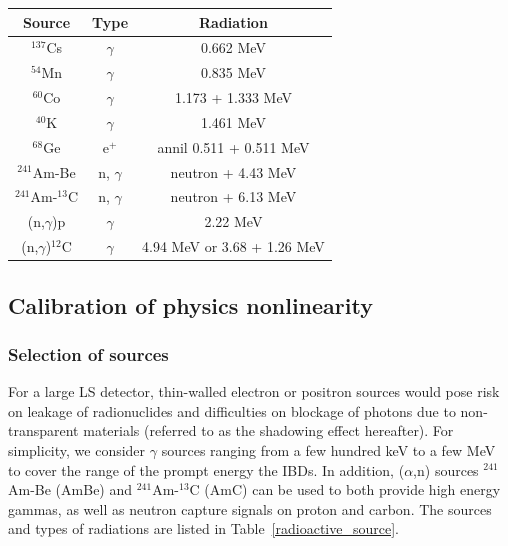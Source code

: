 \documentclass[a4paper,10pt,twoside]{cpc-hepnp}
\begin{document}
\begin{CJK*}{GB}{gbsn}
\begin{multicols}{2}
\begin{center}
	\label{radioactive_source}
        \begin{tabular}{c|c|c}\hline 
          Source & Type & Radiation\\\hline 
          $^{137}$Cs& $\gamma$ & 0.662 MeV\\
          $^{54}$Mn & $\gamma$ & 0.835 MeV\\
          $^{60}$Co & $\gamma$ & 1.173 + 1.333 MeV\\
          $^{40}$K  & $\gamma$ & 1.461 MeV\\
          $^{68}$Ge & e$^{+}$ & annil 0.511 + 0.511 MeV\\
          $^{241}$Am-Be & n, $\gamma$ & neutron + 4.43 MeV \\
          $^{241}$Am-$^{13}$C &n, $\gamma$ & neutron + 6.13 MeV \\
          (n,$\gamma$)p & $\gamma$ & 2.22 MeV \\
          (n,$\gamma$)$^{12}$C & $\gamma$ & 4.94 MeV or 3.68 + 1.26 MeV\\\hline
	\end{tabular}

\end{center}

\subsection{Calibration of physics nonlinearity}
\subsubsection{Selection of sources}
For a large LS detector, thin-walled electron or positron sources
would pose risk on leakage of radionuclides and difficulties on
blockage of photons due to non-transparent materials (referred to as the shadowing effect hereafter). 
For simplicity, we consider $\gamma$ sources
ranging from a few hundred keV to a few MeV to cover the range of the
prompt energy the IBDs. In addition, ($\alpha$,n) sources
$^{241}$Am-Be (AmBe) and $^{241}$Am-$^{13}$C (AmC) can be used to both
provide high energy gammas, as well as neutron capture signals on
proton and carbon. The sources and types of radiations are listed in
Table~\ref{radioactive_source}.


\end{multicols}
\end{CJK*}
\end{document}
